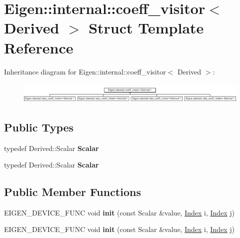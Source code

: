 \hypertarget{struct_eigen_1_1internal_1_1coeff__visitor}{}\section{Eigen\+:\+:internal\+:\+:coeff\+\_\+visitor$<$ Derived $>$ Struct Template Reference}
\label{struct_eigen_1_1internal_1_1coeff__visitor}
Inheritance diagram for Eigen\+:\+:internal\+:\+:coeff\+\_\+visitor$<$ Derived $>$\+:\begin{figure}[H]
\begin{center}
\leavevmode
\includegraphics[height=1.021898cm]{struct_eigen_1_1internal_1_1coeff__visitor}
\end{center}
\end{figure}
\subsection*{Public Types}
\begin{DoxyCompactItemize}
\item 
\mbox{\label{struct_eigen_1_1internal_1_1coeff__visitor_adfb8342e9131db6f1ebee928681ed031}} 
typedef Derived\+::\+Scalar {\bfseries Scalar}
\item 
\mbox{\label{struct_eigen_1_1internal_1_1coeff__visitor_adfb8342e9131db6f1ebee928681ed031}} 
typedef Derived\+::\+Scalar {\bfseries Scalar}
\end{DoxyCompactItemize}
\subsection*{Public Member Functions}
\begin{DoxyCompactItemize}
\item 
\mbox{\label{struct_eigen_1_1internal_1_1coeff__visitor_a539c8a9892058be19907907f7298a100}} 
E\+I\+G\+E\+N\+\_\+\+D\+E\+V\+I\+C\+E\+\_\+\+F\+U\+NC void {\bfseries init} (const Scalar \&value, \hyperlink{namespace_eigen_a62e77e0933482dafde8fe197d9a2cfde}{Index} i, \hyperlink{namespace_eigen_a62e77e0933482dafde8fe197d9a2cfde}{Index} j)
\item 
\mbox{\label{struct_eigen_1_1internal_1_1coeff__visitor_a539c8a9892058be19907907f7298a100}} 
E\+I\+G\+E\+N\+\_\+\+D\+E\+V\+I\+C\+E\+\_\+\+F\+U\+NC void {\bfseries init} (const Scalar \&value, \hyperlink{namespace_eigen_a62e77e0933482dafde8fe197d9a2cfde}{Index} i, \hyperlink{namespace_eigen_a62e77e0933482dafde8fe197d9a2cfde}{Index} j)
\end{DoxyCompactItemize}
